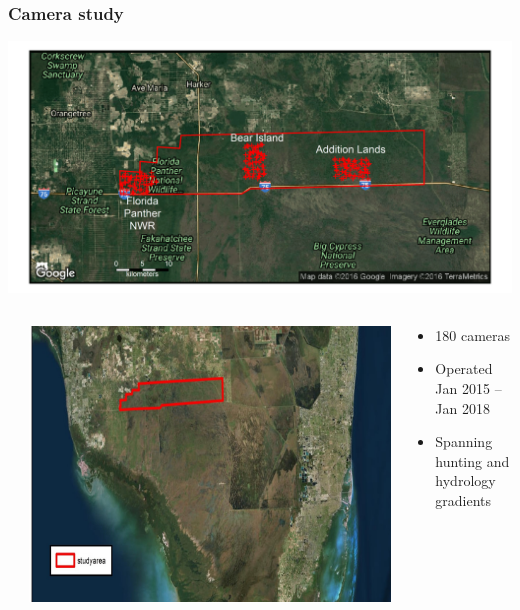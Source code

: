 \documentclass[color=usenames,dvipsnames]{beamer}
\begin{document}
\begin{frame}
  \frametitle{Camera study}
  \centering
  \includegraphics[width=\textwidth]{figs/FL-base-cameras} \\
  \vfill
  \begin{columns}
    \begin{column}{0.05\textwidth}
    \end{column}
    \begin{column}{0.35\textwidth}
      \includegraphics[width=\textwidth,trim = 0mm 8mm 0mm 0mm, clip]{figs/studyArea}
    \end{column}
    \begin{column}{0.6\textwidth}
      \small
      \begin{itemize}
        \item 180 cameras
        \item Operated Jan 2015 -- Jan 2018
        \item Spanning hunting and hydrology gradients
      \end{itemize}
    \end{column}
  \end{columns}
\end{frame}
\end{document}
